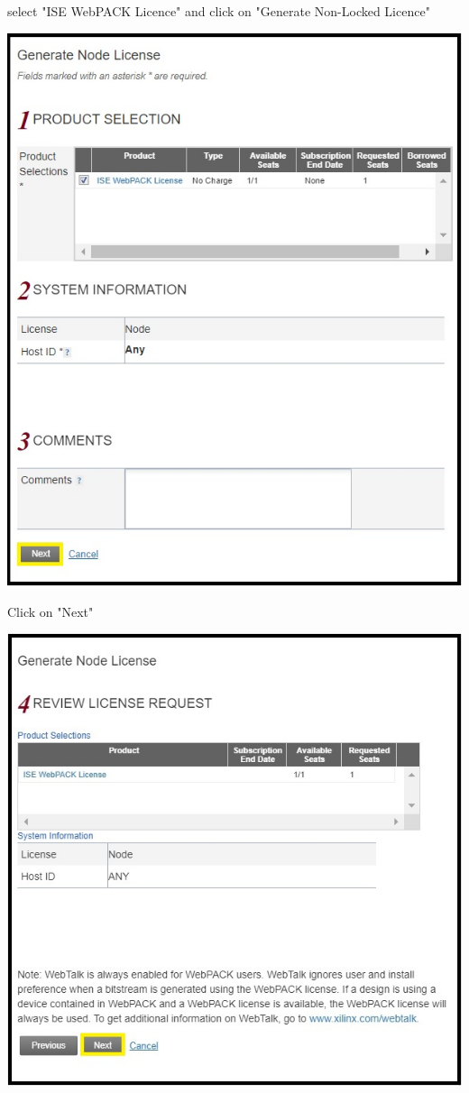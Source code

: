 select "ISE WebPACK Licence" and click on "Generate Non-Locked Licence"

\includegraphics[width=\linewidth]{images/VivadoInstimg027.jpg}

Click on "Next"

\includegraphics[width=\linewidth]{images/VivadoInstimg028.jpg}

